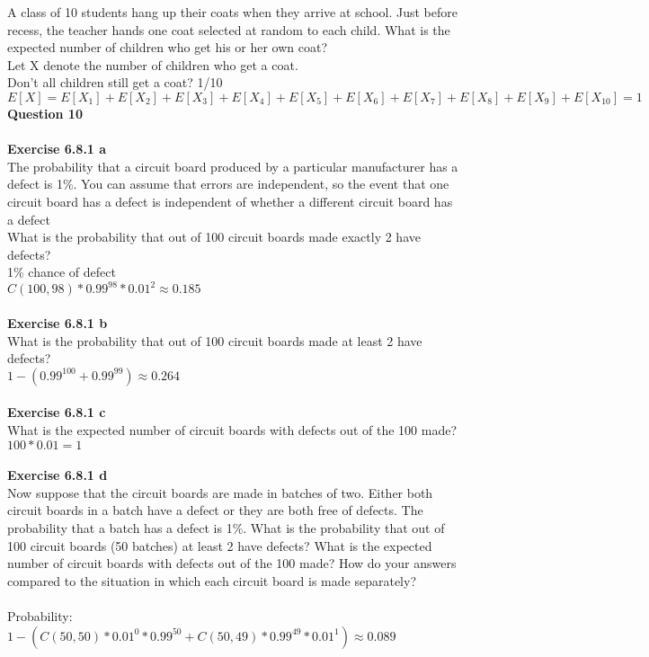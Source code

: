\documentclass{article}
\begin{document}
A class of 10 students hang up their coats when they arrive at school. Just before recess, the teacher hands one coat selected at random to each child. What is the expected number of children who get his or her own coat?\\
Let X denote the number of children who get a coat.\\
Don't all children still get a coat? 1/10\\
$E[X] = E[X_1] + E[X_2] + E[X_3] + E[X_4] + E[X_5] + E[X_6] + E[X_7] + E[X_8] + E[X_9] + E[X_10] = 1$
\newpage
\noindent \textbf{Question 10}\\\\
\textbf{Exercise 6.8.1 a}\\
The probability that a circuit board produced by a particular manufacturer has a defect is 1\%. You can assume that errors are independent, so the event that one circuit board has a defect is independent of whether a different circuit board has a defect\\
What is the probability that out of 100 circuit boards made exactly 2 have defects?\\
1\% chance of defect\\
$C(100,98) * 0.99^{98}* 0.01^2 \approx  0.185$\\\\
\textbf{Exercise 6.8.1 b}\\
What is the probability that out of 100 circuit boards made at least 2 have defects?\\
$1 - (0.99^{100} + 0.99^{99}) \approx 0.264$\\\\
\textbf{Exercise 6.8.1 c}\\
What is the expected number of circuit boards with defects out of the 100 made?\\
$100 * 0.01 = 1$\\\\
\textbf{Exercise 6.8.1 d}\\
Now suppose that the circuit boards are made in batches of two. Either both circuit boards in a batch have a defect or they are both free of defects. The probability that a batch has a defect is 1\%. What is the probability that out of 100 circuit boards (50 batches) at least 2 have defects? What is the expected number of circuit boards with defects out of the 100 made? How do your answers compared to the situation in which each circuit board is made separately?\\\\
Probability: $1- (C(50,50) * 0.01^0 * 0.99^{50} + C(50,49) * 0.99^{49} * 0.01^1) \approx 0.089$\\
\end{document}
